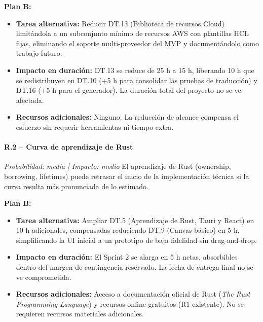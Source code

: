 \documentclass{article}
\begin{document}
{        \textbf{Plan B:}
        \begin{itemize}[leftmargin=*, itemsep=1pt]
            \item \textbf{Tarea alternativa:} Reducir DT.13 (Biblioteca de recursos Cloud) 
            limitándola a un subconjunto mínimo de recursos AWS con plantillas HCL fijas, 
            eliminando el soporte multi-proveedor del MVP y documentándolo como trabajo futuro.
            \item \textbf{Impacto en duración:} DT.13 se reduce de 25 h a 15 h, liberando 
            10 h que se redistribuyen en DT.10 (+5 h para consolidar las pruebas de 
            traducción) y DT.16 (+5 h para el generador). La duración total del proyecto 
            no se ve afectada.
            \item \textbf{Recursos adicionales:} Ninguno. La reducción de alcance compensa 
            el esfuerzo sin requerir herramientas ni tiempo extra.
        \end{itemize}

        \paragraph{R.2 – Curva de aprendizaje de Rust}
        \textit{Probabilidad: media | Impacto: medio}
        \justify
        El aprendizaje de Rust (ownership, borrowing, lifetimes) puede retrasar el inicio 
        de la implementación técnica si la curva resulta más pronunciada de lo estimado.

        \textbf{Plan B:}
        \begin{itemize}[leftmargin=*, itemsep=1pt]
            \item \textbf{Tarea alternativa:} Ampliar DT.5 (Aprendizaje de Rust, Tauri y 
            React) en 10 h adicionales, compensadas reduciendo DT.9 (Canvas básico) en 5 h, 
            simplificando la UI inicial a un prototipo de baja fidelidad sin drag-and-drop.
            \item \textbf{Impacto en duración:} El Sprint 2 se alarga en 5 h netas, 
            absorbibles dentro del margen de contingencia reservado. La fecha de entrega 
            final no se ve comprometida.
            \item \textbf{Recursos adicionales:} Acceso a documentación oficial de Rust 
            (\textit{The Rust Programming Language}) y recursos online gratuitos (R1 
            existente). No se requieren recursos materiales adicionales.
        \end{itemize}

}
\end{document}
